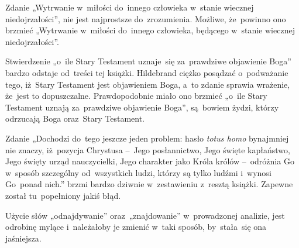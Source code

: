 \documentclass[a4paper,11pt]{article}
\begin{document}
\vspace{\spaceTwo}














\start {} Zdanie „Wytrwanie w~miłości do~innego człowieka
w~stanie wiecznej niedojrzałości”, nie jest najprostsze
do~zrozumienia. Możliwe, że~powinno ono brzmieć „Wytrwanie w~miłości
do~innego człowieka, będącego w~stanie wiecznej niedojrzałości”.

\vspace{\spaceFour}





\start {} Stwierdzenie „o~ile Stary Testament uznaje~się
za~prawdziwe objawienie Boga” bardzo odstaje od~treści tej książki.
Hildebrand ciężko posądzać o~podważanie tego, iż~Stary Testament jest
objawieniem Boga, a~to zdanie sprawia wrażenie, że~jest to
dopuszczalne. Prawdopodobnie miało ono brzmieć „o~ile Stary Testament
uznają za~prawdziwe objawienie Boga”, są~bowiem żydzi, którzy
odrzucają Boga oraz~Stary Testament.

\vspace{\spaceFour}





\start {} Zdanie „Dochodzi do~tego jeszcze jeden problem:
hasło \textit{totus homo} bynajmniej nie znaczy, iż~pozycja Chrystusa
--~Jego posłannictwo, Jego święte kapłaństwo, Jego święty urząd
nauczycielki, Jego charakter jako Króla królów --~odróżnia Go w~sposób
szczególny od~wszystkich ludzi, którzy są tylko ludźmi i~wynosi
Go~ponad nich.” brzmi bardzo dziwnie w~zestawieniu z~resztą książki.
Zapewne został tu~popełniony jakiś błąd.

\vspace{\spaceFour}





\start {} Użycie słów „odnajdywanie” oraz~„znajdowanie”
w~prowadzonej analizie, jest odrobinę mylące i~należałoby je zmienić
w~taki sposób, by~stała~się ona jaśniejsza.
\end{document}
